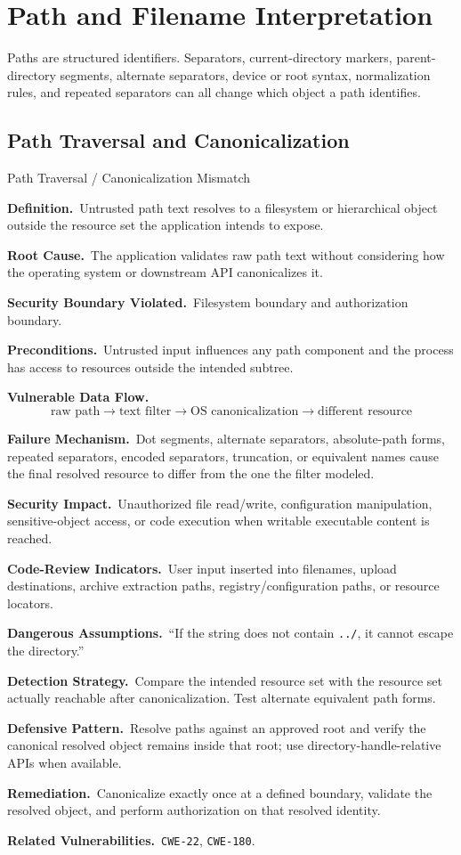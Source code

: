 \documentclass[11pt]{article}
\newcommand{\field}[1]{\par\smallskip\noindent\textbf{#1.}\ }
\newcommand{\cwe}[1]{\texttt{#1}}
\begin{document}
\section{Path and Filename Interpretation}

Paths are structured identifiers. Separators, current-directory markers, parent-directory segments, alternate separators, device or root syntax, normalization rules, and repeated separators can all change which object a path identifies.

\subsection{Path Traversal and Canonicalization}

\begin{catalogbox}{Path Traversal / Canonicalization Mismatch}
\field{Definition}Untrusted path text resolves to a filesystem or hierarchical object outside the resource set the application intends to expose.

\field{Root Cause}The application validates raw path text without considering how the operating system or downstream API canonicalizes it.

\field{Security Boundary Violated}Filesystem boundary and authorization boundary.

\field{Preconditions}Untrusted input influences any path component and the process has access to resources outside the intended subtree.

\field{Vulnerable Data Flow}
\[
\text{raw path} \rightarrow \text{text filter} \rightarrow
\text{OS canonicalization} \rightarrow \text{different resource}
\]

\field{Failure Mechanism}Dot segments, alternate separators, absolute-path forms, repeated separators, encoded separators, truncation, or equivalent names cause the final resolved resource to differ from the one the filter modeled.

\field{Security Impact}Unauthorized file read/write, configuration manipulation, sensitive-object access, or code execution when writable executable content is reached.

\field{Code-Review Indicators}User input inserted into filenames, upload destinations, archive extraction paths, registry/configuration paths, or resource locators.

\field{Dangerous Assumptions}``If the string does not contain \texttt{../}, it cannot escape the directory.''

\field{Detection Strategy}Compare the intended resource set with the resource set actually reachable after canonicalization. Test alternate equivalent path forms.

\field{Defensive Pattern}Resolve paths against an approved root and verify the canonical resolved object remains inside that root; use directory-handle-relative APIs when available.

\field{Remediation}Canonicalize exactly once at a defined boundary, validate the resolved object, and perform authorization on that resolved identity.

\field{Related Vulnerabilities}\cwe{CWE-22}, \cwe{CWE-180}.
\end{catalogbox}
\end{document}
